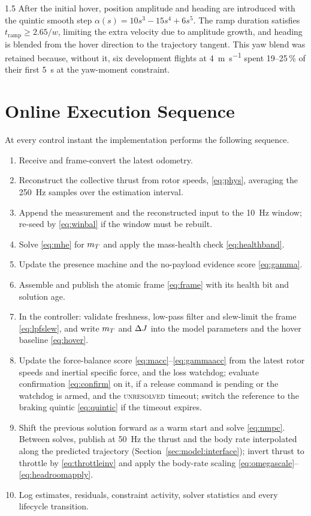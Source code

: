 \begin{spacing}{1.5}
After the initial hover, position amplitude and heading are introduced with the
quintic smooth step $\alpha(s)=10s^3-15s^4+6s^5$. The ramp duration satisfies
$t_{\mathrm{ramp}}\ge2.65/w$, limiting the extra velocity due to amplitude
growth, and heading is blended from the hover direction to the trajectory
tangent. This yaw blend was retained because, without it, six development
flights at \SI{4}{\meter\per\second} spent 19--25\,\% of their first
\SI{5}{\second} at the yaw-moment constraint.

\section{Online Execution Sequence}\label{sec:frame:sequence}

At every control instant the implementation performs the following sequence.

\begin{enumerate}
\item Receive and frame-convert the latest odometry.
\item Reconstruct the collective thrust from rotor speeds, \eqref{eq:phys},
averaging the \SI{250}{\hertz} samples over the estimation interval.
\item Append the measurement and the reconstructed input to the \SI{10}{\hertz}
window; re-seed by \eqref{eq:winbal} if the window must be rebuilt.
\item Solve \eqref{eq:mhe} for $m_T$ and apply the mass-health check
\eqref{eq:healthband}.
\item Update the presence machine and the no-payload evidence score \eqref{eq:gamma}.
\item Assemble and publish the atomic frame \eqref{eq:frame} with its health bit
and solution age.
\item In the controller: validate freshness, low-pass filter and slew-limit the
frame \eqref{eq:lpfslew}, and write $m_T$ and $\Delta J$ into the model parameters
and the hover baseline \eqref{eq:hover}.
\item Update the force-balance score \eqref{eq:macc}--\eqref{eq:gammaacc} from
the latest rotor speeds and inertial specific force, and the loss watchdog;
evaluate confirmation \eqref{eq:confirm} on it, if a release command is pending
or the watchdog is armed, and the \textsc{unresolved} timeout; switch the
reference to the braking quintic \eqref{eq:quintic} if the timeout expires.
\item Shift the previous solution forward as a warm start and solve
\eqref{eq:nmpc}. Between solves, publish at \SI{50}{\hertz} the thrust and the
body rate interpolated along the predicted trajectory
(Section~\ref{sec:model:interface}); invert thrust to throttle by
\eqref{eq:throttleinv} and apply the body-rate scaling
\eqref{eq:omegascale}--\eqref{eq:headroomapply}.
\item Log estimates, residuals, constraint activity, solver statistics and every
lifecycle transition.
\end{enumerate}


\end{spacing}
